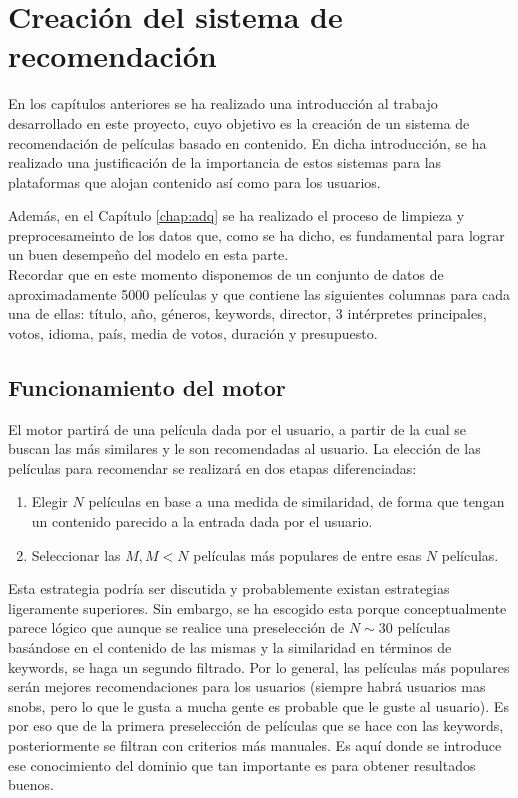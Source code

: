 \chapter{Creación del sistema de recomendación}\label{chap:creacion}


En los capítulos anteriores se ha realizado una introducción al trabajo desarrollado en este proyecto, cuyo objetivo es la creación de un sistema de recomendación de películas basado en contenido. En dicha introducción, se ha realizado una justificación de la importancia de estos sistemas para las plataformas que alojan contenido así como para los usuarios.

Además, en el Capítulo \ref{chap:adq} se ha realizado el proceso de limpieza y preprocesameinto de los datos que, como se ha dicho, es fundamental para lograr un buen desempeño del modelo en esta parte.\\

Recordar que en este momento disponemos de un conjunto de datos de aproximadamente 5000 películas y que contiene las siguientes columnas para cada una de ellas: título, año, géneros, keywords, director, 3 intérpretes principales, votos, idioma, país, media de votos, duración y presupuesto.

\section{Funcionamiento del motor}

El motor partirá de una película dada por el usuario, a partir de la cual se buscan las más similares y le son recomendadas al usuario. La elección de las películas para recomendar se realizará en dos etapas diferenciadas:
\begin{enumerate}
    \item Elegir $N$ películas en base a una medida de similaridad, de forma que tengan un contenido parecido a la entrada dada por el usuario.
    \item Seleccionar las $M, M<N$ películas más populares de entre esas $N$ películas.
\end{enumerate}

Esta estrategia podría ser discutida y probablemente existan estrategias ligeramente superiores. Sin embargo, se ha escogido esta porque conceptualmente parece lógico que aunque se realice una preselección de $N \sim 30$ películas basándose en el contenido de las mismas y la similaridad en términos de keywords, se haga un segundo filtrado. Por lo general, las películas más populares serán mejores recomendaciones para los usuarios (siempre habrá usuarios mas snobs, pero lo que le gusta a mucha gente es probable que le guste al usuario). Es por eso que de la primera preselección de películas que se hace con las keywords, posteriormente se filtran con criterios más manuales. Es aquí donde se introduce ese conocimiento del dominio que tan importante es para obtener resultados buenos.


